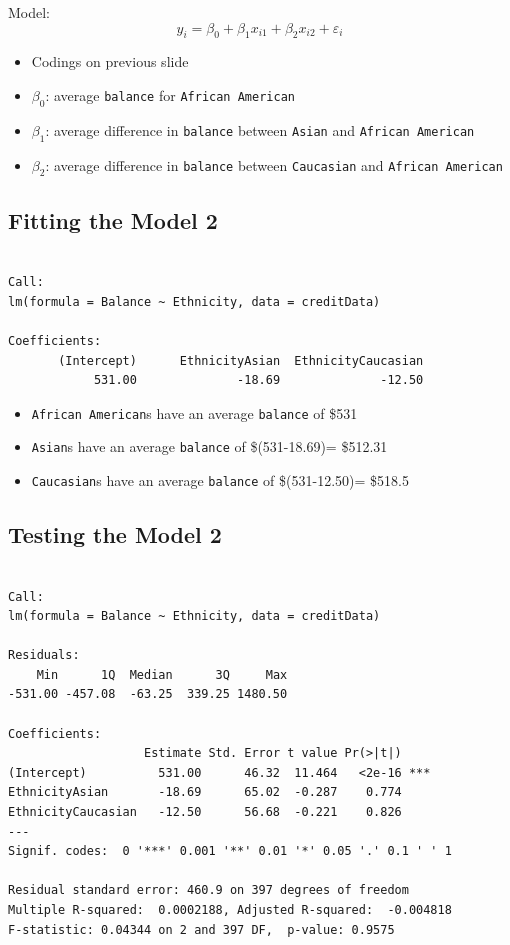 \documentclass[]{article}
\providecommand{\tightlist}{%
  \setlength{\itemsep}{0pt}\setlength{\parskip}{0pt}}
\begin{document}
Model:
\[y_i = \beta_0 + \beta_1 x_{i1} +\beta_2 x_{i2} + \varepsilon_i\]

\begin{itemize}
\tightlist
\item
  Codings on previous slide
\item
  \(\beta_0\): average \texttt{balance} for \texttt{African\ American}
\item
  \(\beta_1\): average difference in \texttt{balance} between
  \texttt{Asian} and \texttt{African\ American}
\item
  \(\beta_2\): average difference in \texttt{balance} between
  \texttt{Caucasian} and \texttt{African\ American}
\end{itemize}

\subsection{Fitting the Model 2}\label{fitting-the-model-2}

\begin{verbatim}

Call:
lm(formula = Balance ~ Ethnicity, data = creditData)

Coefficients:
       (Intercept)      EthnicityAsian  EthnicityCaucasian  
            531.00              -18.69              -12.50  
\end{verbatim}

\begin{itemize}
\tightlist
\item
  \texttt{African\ American}s have an average \texttt{balance} of \$531
\item
  \texttt{Asian}s have an average \texttt{balance} of \$(531-18.69)=
  \$512.31
\item
  \texttt{Caucasian}s have an average \texttt{balance} of \$(531-12.50)=
  \$518.5
\end{itemize}

\subsection{Testing the Model 2}\label{testing-the-model-2}

\begin{verbatim}

Call:
lm(formula = Balance ~ Ethnicity, data = creditData)

Residuals:
    Min      1Q  Median      3Q     Max 
-531.00 -457.08  -63.25  339.25 1480.50 

Coefficients:
                   Estimate Std. Error t value Pr(>|t|)    
(Intercept)          531.00      46.32  11.464   <2e-16 ***
EthnicityAsian       -18.69      65.02  -0.287    0.774    
EthnicityCaucasian   -12.50      56.68  -0.221    0.826    
---
Signif. codes:  0 '***' 0.001 '**' 0.01 '*' 0.05 '.' 0.1 ' ' 1

Residual standard error: 460.9 on 397 degrees of freedom
Multiple R-squared:  0.0002188, Adjusted R-squared:  -0.004818 
F-statistic: 0.04344 on 2 and 397 DF,  p-value: 0.9575
\end{verbatim}
\end{document}
